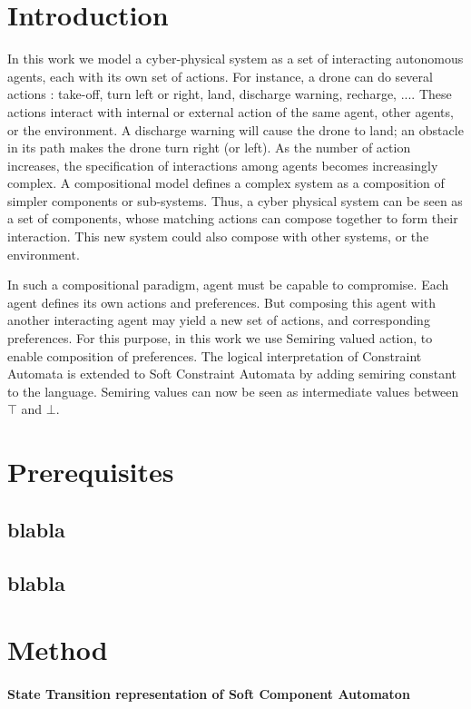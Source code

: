 \documentclass{article}
\begin{document}
\noindent

\section{Introduction}
In this work we model a cyber-physical system as a set of interacting autonomous agents, each with its own set of actions. For instance, a drone can do several actions : take-off, turn left or right, land, discharge warning, recharge, .... These actions interact with internal or external action of the same agent, other agents, or the environment. A discharge warning will cause the drone to land; an obstacle in its path makes the drone turn right (or left). As the number of action increases, the specification of interactions among agents becomes increasingly complex. A compositional model defines a complex system as a composition of simpler components or sub-systems. Thus, a cyber physical system can be seen as a set of components, whose matching actions can compose together to form their interaction. This new system could also compose with other systems, or the environment.

In such a compositional paradigm, agent must be capable to compromise. Each agent defines its own actions and preferences. But composing this agent with another interacting agent may yield a new set of actions, and corresponding preferences. For this purpose, in this work we use Semiring valued action, to enable composition of preferences. The logical interpretation of Constraint Automata is extended to Soft Constraint Automata by adding semiring constant to the language. Semiring values can now be seen as intermediate values between $\top$ and $\bot$.

\section{Prerequisites}
\subsection{blabla}
\subsection{blabla}
\section{Method}

\paragraph{State Transition representation of Soft Component Automaton} \hspace{0pt} \\
\end{document}
